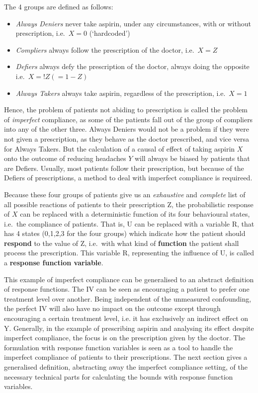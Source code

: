 \documentclass{article}
\begin{document}
\noindent The 4 groups are defined as follows:
\begin{itemize}
\item\emph{Always Deniers} never take
aspirin, under any circumstances, with or without prescription,
i.e.~\(X=0\) (`hardcoded') 
\item\emph{Compliers} always follow the
prescription of the doctor, i.e.~\(X=Z\) 
\item\emph{Defiers} always defy
the prescription of the doctor, always doing the opposite
i.e.~\(X=!Z (=1-Z)\) 
\item\emph{Always Takers} always take aspirin,
regardless of the prescription, i.e.~\(X=1\)
\end{itemize}

Hence, the problem of patients not abiding to prescription is called the
problem of \emph{imperfect} compliance, as some of the patients fall out
of the group of compliers into any of the other three. Always Deniers
would not be a problem if they were not given a prescription, as they behave
as the doctor prescribed, and vice versa for Always Takers. But the
calculation of a causal of effect of taking aspirin \(X\) onto the
outcome of reducing headaches \(Y\) will always be biased by patients
that are Defiers. Usually, most patients follow their prescription, but
because of the Defiers of prescriptions, a method to deal with imperfect compliance is requireed.

Because these four groups of patients give us an \emph{exhaustive} and
\emph{complete} list of all possible reactions of patients to their
prescription Z, the probabilistic response of \(X\) can be replaced with
a deterministic function of its four behavioural states, i.e.~the
compliance of patients. That is, U can be replaced with a variable R,
that has 4 states (0,1,2,3 for the four groups) which indicate how the
patient should \textbf{respond} to the value of Z, i.e.~with what kind
of \textbf{function} the patient shall process the prescription. This
variable R, representing the influence of U, is called a
\textbf{response function variable}.

This example of imperfect compliance can be generalised to an abstract
definition of response functions. The IV can be seen as encouraging a
patient to prefer one treatment level over another. Being independent of
the unmeasured confounding, the perfect IV will also have no impact on
the outcome except through encouraging a certain treatment level,
i.e. it has exclusively an indirect effect on Y. Generally, in the example of
prescribing aspirin and analysing its effect despite imperfect
compliance, the focus is on the prescription given by the doctor. The
formulation with response function variables is seen as a tool to handle
the imperfect compliance of patients to their prescriptions. The next
section gives a generalised definition, abstracting away the imperfect compliance setting, of the necessary technical parts for calculating the bounds with response function variables.
\end{document}

